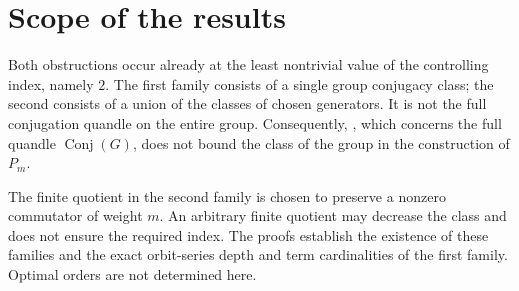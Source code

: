\documentclass[11pt,a4paper]{article}
\theoremstyle{definition}
\theoremstyle{remark}
\begin{document}
\section{Scope of the results}

Both obstructions occur already at the least nontrivial
value of the controlling index, namely \(2\).
The first family consists of a single group conjugacy class;
the second consists of a union of the classes of chosen generators.
It is not the full conjugation quandle on the entire group.
Consequently, \cite[Corollary~5.24]{BCNW}, which concerns
the full quandle \(\operatorname{Conj}(G)\),
does not bound the class of the group in the construction of \(P_m\).

The finite quotient in the second family is chosen
to preserve a nonzero commutator of weight \(m\).
An arbitrary finite quotient may decrease the class
and does not ensure the required index.
The proofs establish the existence of these families and the exact
orbit-series depth and term cardinalities of the first family.
Optimal orders are not determined here.
\end{document}
